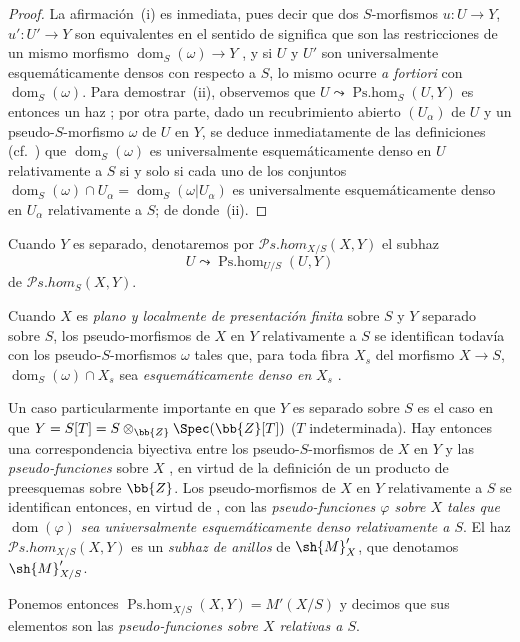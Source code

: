 \begin{proof}
La afirmación~(i) es inmediata, pues decir que dos $S$-morfismos $u:U\to Y$, $u':U'\to Y$ son equivalentes en el sentido de  significa que son las restricciones de un mismo morfismo $\operatorname{dom}_S(\omega)\to Y$ , y si $U$ y $U'$ son universalmente esquemáticamente densos con respecto a $S$, lo mismo ocurre \emph{a fortiori} con $\operatorname{dom}_S(\omega)$.
Para demostrar~(ii), observemos que $U\leadsto\operatorname{Ps.hom}_S(U,Y)$ es entonces un haz ; por otra parte, dado un recubrimiento abierto $(U_\alpha)$ de $U$ y un pseudo-$S$-morfismo $\omega$ de $U$ en $Y$, se deduce inmediatamente de las definiciones (cf.\ ) que $\operatorname{dom}_S(\omega)$ es universalmente esquemáticamente denso en $U$ relativamente a $S$ si y solo si cada uno de los conjuntos $\operatorname{dom}_S(\omega)\cap U_\alpha=\operatorname{dom}_S(\omega|U_\alpha)$ es universalmente esquemáticamente denso en $U_\alpha$ relativamente a $S$; de donde~(ii).
\end{proof}

Cuando $Y$ es separado, denotaremos por $\mathscr{P}\!s.\mathit{hom}_{X/S}(X,Y)$ el subhaz
\[
  U\leadsto\operatorname{Ps.hom}_{U/S}(U,Y)
\]
de $\mathscr{P}\!s.\mathit{hom}_S(X,Y)$.

Cuando $X$ es \emph{plano y localmente de presentación finita} sobre $S$ y $Y$ separado sobre $S$, los pseudo-morfismos de $X$ en $Y$ relativamente a $S$ se identifican todavía con los pseudo-$S$-morfismos $\omega$ tales que, para toda fibra $X_s$ del morfismo $X\to S$, $\operatorname{dom}_S(\omega)\cap X_s$ sea \emph{esquemáticamente denso en} $X_s$ .

\begin{env}[20.5.4]
\label{IV.20.5.4}
Un caso particularmente importante en que $Y$ es separado sobre $S$ es el caso en que $Y=S[T]=S\otimes_{\bb{Z}}\Spec(\bb{Z}[T])$ ($T$ indeterminada).
Hay entonces una correspondencia biyectiva entre los pseudo-$S$-morfismos de $X$ en $Y$ y las \emph{pseudo-funciones} sobre $X$ , en virtud de la definición de un producto de preesquemas sobre $\bb{Z}$.
Los pseudo-morfismos de $X$ en $Y$ relativamente a $S$ se identifican entonces, en virtud de , con las \emph{pseudo-funciones $\varphi$ sobre $X$ tales que $\operatorname{dom}(\varphi)$ sea universalmente esquemáticamente denso relativamente a $S$}.
El haz $\mathscr{P}\!s.\mathit{hom}_{X/S}(X,Y)$ es un \emph{subhaz de anillos} de $\sh{M}'_X$, que denotamos $\sh{M}'_{X/S}$.

Ponemos entonces $\operatorname{Ps.hom}_{X/S}(X,Y)=M'(X/S)$ y decimos que sus elementos son las \emph{pseudo-funciones sobre $X$ relativas a $S$}.
\end{env}

